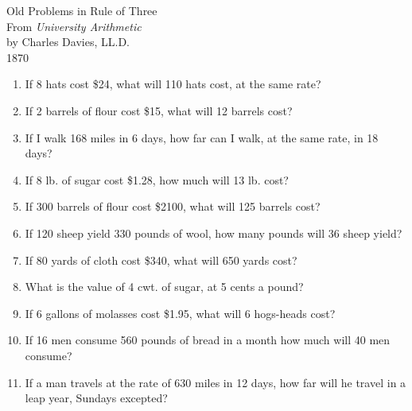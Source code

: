 \documentclass[12pt]{article}
\begin{document}
\pagestyle{empty} %
\begin{center}
          Old Problems in  Rule of Three \\
		From \textit{University Arithmetic} \\ 
		by Charles Davies, LL.D. \\
		1870 %

\end{center}
  \vspace{0.25in}

\begin{enumerate}
		\newcommand{\spacing}{\vspace{0.70in}}
\item If 8 hats cost \$24, what will 110 hats cost, at the same rate? 
\spacing

\item If 2 barrels of flour cost \$15, what will 12 barrels cost? 
\spacing

\item If I walk 168 miles in 6 days, how far can I walk, at the same rate, in 18 days? 
\spacing

\item If 8 lb. of sugar cost \$1.28, how much will 13 lb. cost? 
\spacing

\item If 300 barrels of flour cost \$2100, what will 125 barrels cost? 
\spacing

\item If 120 sheep yield 330 pounds of wool, how many pounds will 36 sheep yield? 
\spacing

\item If 80 yards of cloth cost \$340, what will 650 yards cost? 
\spacing

\item What is the value of 4 cwt. of sugar, at 5 cents a pound? 
\spacing

\item If 6 gallons of molasses cost \$1.95, what will 6 hogs-heads cost? 
\spacing

\item If 16 men consume 560 pounds of bread in a month how much will 40 men consume? 
\spacing

\item If a man travels at the rate of 630 miles in 12 days, how far will he travel in a leap year, Sundays excepted? 
\spacing


\end{enumerate}
\end{document}
